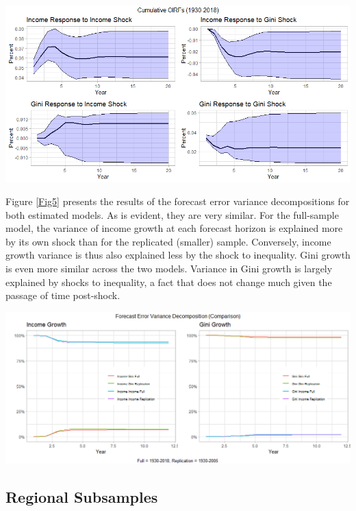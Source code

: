 \documentclass[11pt,preprint, authoryear]{elsarticle}
\let\origfigure\figure
\let\endorigfigure\endfigure
\renewenvironment{figure}[1][2] {
    \expandafter\origfigure\expandafter[H]
} {
    \endorigfigure
}
\numberwithin{equation}{section}
\numberwithin{figure}{section}
\numberwithin{table}{section}
\begin{document}
\begin{figure}[H]

{\centering \includegraphics[width=1\linewidth]{images/Fig4_baseline_full_COIRFs} 

}

\caption{\label{Fig4}}\label{fig:Fig4}
\end{figure}

Figure \ref{Fig5} presents the results of the forecast error variance
decompositions for both estimated models. As is evident, they are very
similar. For the full-sample model, the variance of income growth at
each forecast horizon is explained more by its own shock than for the
replicated (smaller) sample. Conversely, income growth variance is thus
also explained less by the shock to inequality. Gini growth is even more
similar across the two models. Variance in Gini growth is largely
explained by shocks to inequality, a fact that does not change much
given the passage of time post-shock.

\begin{figure}[H]
\includegraphics[width=1\linewidth]{images/Fig5_fevd_all} \caption{\label{Fig5}}\label{fig:Fig5}
\end{figure}

\hypertarget{regional-subsamples}{%
\subsection{\texorpdfstring{Regional Subsamples
\label{Section 3.4}}{Regional Subsamples }}\label{regional-subsamples}}
\end{document}
